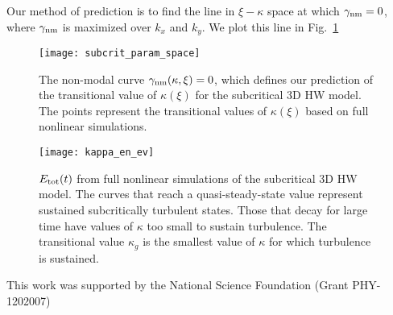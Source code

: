 \documentclass[twocolumn,showkeys,superscriptaddress]{revtex4}
\begin{document}
Our method
of prediction is to find the line in $\xi-\kappa$ space at which $\gamma_{\rm{nm}} = 0$, where $\gamma_{\rm{nm}}$ is maximized over $k_x$ and $k_y$. We plot this line in Fig.~\ref{subcrit_param_space}

\begin{figure}
\centerline{\texttt{[image: subcrit\_param\_space]}}
\caption{The non-modal curve $\gamma_{\rm{nm}}(\kappa,\xi) = 0$, which defines our prediction of the transitional value of $\kappa(\xi)$ for the subcritical 3D HW model. The points represent the
transitional values of $\kappa(\xi)$ based on full nonlinear simulations.}
\label{subcrit_param_space}
\end{figure}


\begin{figure}
\centerline{\texttt{[image: kappa\_en\_ev]}}
\caption{$E_{\rm{tot}}(t)$ from full nonlinear simulations of the subcritical 3D HW model. The curves that reach a quasi-steady-state value represent sustained subcritically turbulent states. 
Those that decay for large time have values of $\kappa$ too small to sustain turbulence. The transitional value $\kappa_g$ is the smallest value of $\kappa$ for which turbulence is sustained.}
\label{kappa_en_ev}
\end{figure}


\begin{acknowledgments}
This work was supported by the National Science Foundation (Grant PHY-1202007)
\end{acknowledgments}


%

\end{document}
